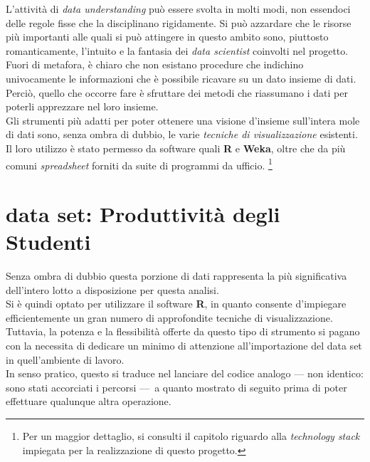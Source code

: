 L'attività di \textit{data understanding} può essere svolta in molti modi, non essendoci delle regole fisse che la disciplinano rigidamente. Si può azzardare che le risorse più importanti alle quali si può attingere in questo ambito sono, piuttosto romanticamente, l'intuito e la fantasia dei \textit{data scientist} coinvolti nel progetto. Fuori di metafora, è chiaro che non esistano procedure che indichino univocamente le informazioni che è possibile ricavare su un dato insieme di dati. Perciò, quello che occorre fare è sfruttare dei metodi che riassumano i dati per poterli apprezzare nel loro insieme. \\

Gli strumenti più adatti per poter ottenere una visione d'insieme sull'intera mole di dati sono, senza ombra di dubbio, le varie \textit{tecniche di visualizzazione} esistenti. Il loro utilizzo è stato permesso da software quali \textbf{R} e \textbf{Weka}, oltre che da più comuni \textit{spreadsheet} forniti da suite di programmi da ufficio. \footnote{Per un maggior dettaglio, si consulti il capitolo riguardo alla \textit{technology stack} impiegata per la realizzazione di questo progetto.}


\section{data set: Produttività degli Studenti}


Senza ombra di dubbio questa porzione di dati rappresenta la più significativa dell'intero lotto a disposizione per questa analisi. \\

Si è quindi optato per utilizzare il software \textbf{R}, in quanto consente d'impiegare efficientemente un gran numero di approfondite tecniche di visualizzazione. Tuttavia, la potenza e la flessibilità offerte da questo tipo di strumento si pagano con la necessita di dedicare un minimo di attenzione all'importazione del data set in quell'ambiente di lavoro. \\

In senso pratico, questo si traduce nel lanciare del codice analogo \footnotesize{--- non identico: sono stati accorciati i percorsi ---}\normalsize\ a quanto mostrato di seguito prima di poter effettuare qualunque altra operazione.

